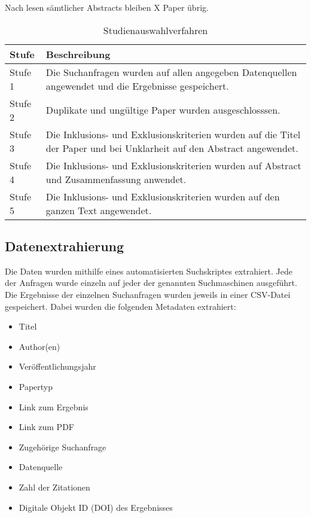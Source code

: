 \documentclass[conference,compsoc]{IEEEtran}
\begin{document}
Nach lesen sämtlicher Abstracts bleiben X Paper übrig.

\begin{table}[h]
	\caption{Studienauswahlverfahren}
\begin{tabular}{p{1cm}|p{6.5cm}}

	Stufe & Beschreibung \\
	\hline	
	Stufe 1 & Die Suchanfragen wurden auf allen angegeben Datenquellen angewendet und die Ergebnisse gespeichert.\\
	
	Stufe 2 & Duplikate und ungültige Paper wurden ausgeschlosssen.\\
	
	Stufe 3 & Die Inklusions- und Exklusionskriterien wurden auf die Titel der Paper und bei Unklarheit auf den Abstract angewendet. \\
	
	Stufe 4 & Die Inklusions- und Exklusionskriterien wurden auf Abstract und Zusammenfassung anwendet. \\
	
	Stufe 5 & Die Inklusions- und Exklusionskriterien wurden auf den ganzen Text angewendet.
	
\end{tabular}
\end{table}
\subsection{Datenextrahierung}
Die Daten wurden mithilfe eines automatisierten Suchskriptes extrahiert.
Jede der Anfragen wurde einzeln auf jeder der genannten Suchmaschinen ausgeführt. Die Ergebnisse der einzelnen Suchanfragen wurden jeweils in einer CSV-Datei gespeichert.
Dabei wurden die folgenden Metadaten extrahiert:

\begin{itemize}
	\item Titel
	\item Author(en)
	\item Veröffentlichungsjahr
	\item Papertyp
	\item Link zum Ergebnis
	\item Link zum PDF
	\item Zugehörige Suchanfrage
	\item Datenquelle
	\item Zahl der Zitationen
	\item Digitale Objekt ID (DOI) des Ergebnisses
\end{itemize}
\end{document}
